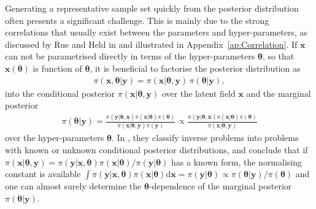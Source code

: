 Generating a representative sample set quickly from the posterior distribution often presents a significant challenge. This is mainly due to the strong correlations that usually exist between the parameters and hyper-parameters, as discussed by Rue and Held in \cite{rue2005gaussian} and illustrated in Appendix~\ref{ap:Correlation}.
If $\bm{x}$ can not be parametrised directly in terms of the hyper-parameters $\bm{\theta}$, so that $\bm{x}(\bm{\theta})$ is function of $\bm{\theta}$, it is beneficial to factorise the posterior distribution as
\begin{align}
	\pi(\bm{x}, \bm{\theta} |  \bm{y}) = \pi(\bm{x} |  \bm{\theta}, \bm{y}) \, \pi(\bm{\theta} |   \bm{y}), \label{eq:MTC}
\end{align}
into the conditional posterior $\pi(\bm{x} |  \bm{\theta}, \bm{y})$ over the latent field $\bm{x}$ and the marginal posterior 
\begin{align}
	\pi(\bm{\theta} |   \bm{y}) =  \frac{ \pi(   \bm{y} | \bm{\theta} ,\bm{x})  \pi( \bm{x} | \bm{\theta} )  \pi(\bm{\theta}) }{ \pi(\bm{x} | \bm{\theta} ,   \bm{y})   \pi( \bm{y})} \propto \frac{ \pi(   \bm{y} | \bm{\theta} ,\bm{x})  \pi( \bm{x} | \bm{\theta} )  \pi(\bm{\theta}) }{ \pi(\bm{x} | \bm{\theta} ,   \bm{y}) } \label{eq:margGen}
\end{align}
over the hyper-parameters $\bm{\theta}$.
In \cite{norton2018sampling}, they classify inverse problems into problems with known or unknown conditional posterior distributions, and conclude that if $\pi(\bm{x} | \bm{\theta} ,   \bm{y}) = \pi(\bm{y} | \bm{x}, \bm{\theta} ) \pi(\bm{x}| \bm{\theta})  / \pi(   \bm{y}| \bm{\theta})$ has a known form, the normalising constant is available \newline $\int \pi(\bm{y} | \bm{x}, \bm{\theta} ) \pi(\bm{x}| \bm{\theta}) \text{d} \bm{x} = \pi(   \bm{y}| \bm{\theta})  \propto \pi( \bm{\theta}|\bm{y}) / \pi(\bm{\theta})$ and one can almost surely determine the $\bm{\theta}$-dependence of the marginal posterior $\pi(\bm{\theta} |   \bm{y})$.

